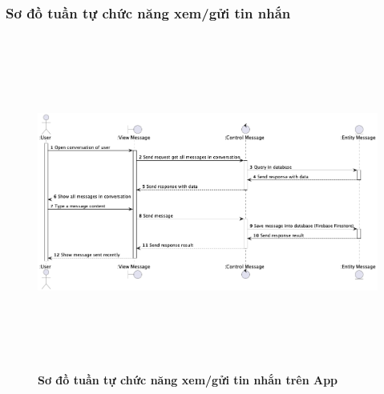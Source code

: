 \documentclass{article}%
\begin{document}
\subsubsection{Sơ đồ tuần tự chức năng xem/gửi tin nhắn}
  \begin{figure}[H]
        \centering
        \includegraphics[width=16cm,height=11cm]{Images/mobile_app/send_and_receive_message.png}
        \caption[Sơ đồ tuần tự chức năng xem/gửi tin nhắn trên App]{\bfseries \fontsize{12pt}{0pt}
        \selectfont Sơ đồ tuần tự chức năng xem/gửi tin nhắn trên App}
        \label{hinh21} %
  \end{figure}
\end{document}
